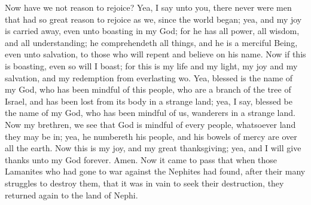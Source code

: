 Now have we not reason to rejoice? Yea, I say unto you, there never were men that had so great reason to rejoice as we, since the world began; yea, and my joy is carried away, even unto boasting in my God; for he has all power, all wisdom, and all understanding; he comprehendeth all things, and he is a merciful Being, even unto salvation, to those who will repent and believe on his name.
\bverse \iffalse Now if this is boasting, even so will I boast; for this is my life and my light, my joy and my salvation, and my redemption from everlasting wo. Yea, blessed is the name of my God, who has been mindful of this people, who are a branch of the tree of Israel, and has been lost from its body in a strange land; yea, I say, blessed be the name of my God, who has been mindful of us, wanderers in a strange land. \fi
Now if this is boasting, even so will I boast; for this is my life and my light, my joy and my salvation, and my redemption from everlasting wo. Yea, blessed is the name of my God, who has been mindful of this people, who are a branch of the tree of Israel, and has been lost from its body in a strange land; yea, I say, blessed be the name of my God, who has been mindful of us, wanderers in a strange land.
\bverse \iffalse Now my brethren, we see that God is mindful of every people, whatsoever land they may be in; yea, he numbereth his people, and his bowels of mercy are over all the earth. Now this is my joy, and my great thanksgiving; yea, and I will give thanks unto my God forever. Amen. \fi
Now my brethren, we see that God is mindful of every people, whatsoever land they may be in; yea, he numbereth his people, and his bowels of mercy are over all the earth. Now this is my joy, and my great thanksgiving; yea, and I will give thanks unto my God forever. Amen.
\bchapter
\bverse \iffalse Now it came to pass that when those Lamanites who had gone to war against the Nephites had found, after their many struggles to destroy them, that it was in vain to seek their destruction, they returned again to the land of Nephi. \fi
Now it came to pass that when those Lamanites who had gone to war against the Nephites had found, after their many struggles to destroy them, that it was in vain to seek their destruction, they returned again to the land of Nephi.
\bverse \iffalse And it came to pass that the Amalekites, because of their loss, were exceedingly angry. And when they saw that they could not seek revenge from the Nephites, they began to stir up the people in anger against their brethren, the people of Anti-Nephi-Lehi; therefore they began again to destroy them. \fi

